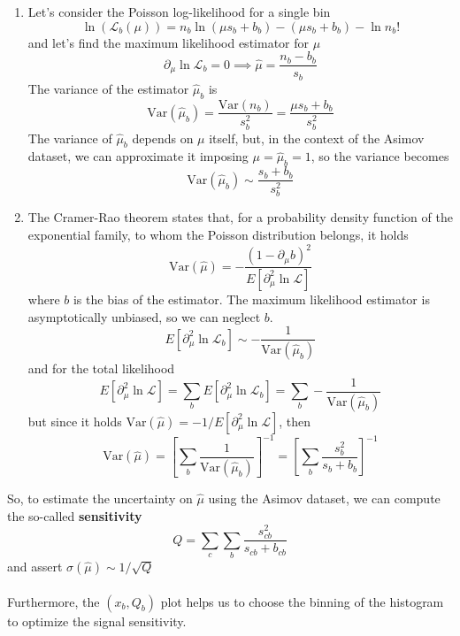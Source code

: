 \begin{enumerate}
    \item Let's consider the Poisson log-likelihood for a single bin
\begin{equation}
    \ln\left(\mathcal{L}_b(\mu)\right)=n_b \ln(\mu s_b + b_b) - (\mu s_b + b_b)-\ln n_b! 
\end{equation}
and let's find the maximum likelihood estimator for $\mu$
\begin{equation}
    \partial_\mu \ln{\mathcal{L}_b}=0 \implies \hat{\mu}=\frac{n_b-b_b}{s_b}
\end{equation}
The variance of the estimator $\hat{\mu}_b$ is
\begin{equation}
    {\mathrm{Var}}(\hat{\mu}_b)=\frac{{\mathrm{Var}}(n_b)}{s_b^2}=\frac{\mu s_b + b_b }{s_b^2}
\end{equation}
The variance of $\hat{\mu}_b$ depends on $\mu$ itself, but, in the context of the Asimov dataset, we can approximate it imposing $\mu=\hat{\mu}_b=1$, so the variance becomes
\begin{equation}
    {\mathrm{Var}}(\hat{\mu}_b)\sim \frac{s_b+b_b}{s_b^2}
\end{equation}
\newpage
 \item The Cramer-Rao theorem \cite{James2006StatisticalEdition} states that, for a probability density function of the exponential family, to whom the Poisson distribution belongs, it holds
\begin{equation}
    \mathrm{Var}(\hat{\mu})=-\frac{(1-\partial_\mu b)^2}{E[\partial_\mu^2 \ln \mathcal{L}]}
\end{equation}
where $b$ is the bias of the estimator.
The maximum likelihood estimator is asymptotically unbiased, so we can neglect $b$.
\begin{equation}
    E[\partial_\mu^2 \ln \mathcal{L}_b]\sim-\frac{1}{\mathrm{Var}(\hat{\mu}_b)}
\end{equation}
and for the total likelihood
\begin{equation}
    E[\partial_\mu^2 \ln \mathcal{L}]=
    \sum_b E[\partial_\mu^2 \ln \mathcal{L}_b]=\sum_b
    -\frac{1}{\mathrm{Var}(\hat{\mu}_b)}
\end{equation}
but since it holds $\mathrm{Var}(\hat{\mu}) =-1/E[\partial_\mu^2 \ln \mathcal{L}]$, then
\begin{equation}
    \mathrm{Var}(\hat{\mu})=\left[\sum_b \frac{1}{\mathrm{Var}(\hat{\mu}_b)}\right]^{-1}= \left[\sum_b \frac{s_b^2}{s_b+b_b} \right]^{-1}
\end{equation}
\end{enumerate}
So, to estimate the uncertainty on $\hat{\mu}$ using the Asimov dataset, we can compute the so-called \textbf{sensitivity}
\begin{equation}
    Q=\sum_c \sum_b \frac{s_{cb}^2}{s_{cb}+b_{cb}}
\end{equation}
and assert $\sigma(\hat{\mu}) \sim 1/\sqrt{Q}$\\
\\
Furthermore, the $(x_b,Q_b)$ plot helps us to choose the binning of the histogram to optimize the signal sensitivity.

